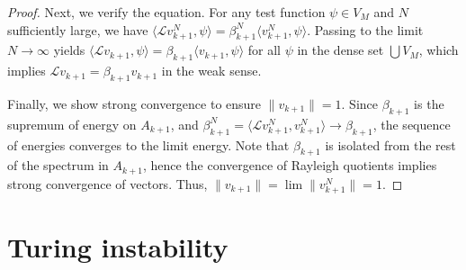 \documentclass[11pt, a4paper]{article}
\theoremstyle{break}
\theoremstyle{break}
\theoremstyle{break}
\theoremstyle{break}
\theoremstyle{break}
\theoremstyle{break}
\theoremstyle{break}
\theoremstyle{break}
\theoremstyle{break}
\theoremstyle{break}
\begin{document}
\begin{proof}
    Next, we verify the equation. For any test function $\psi \in V_M$ and $N$ sufficiently large, we have $\langle \mathcal{L} v_{k+1}^N, \psi \rangle = \beta_{k+1}^N \langle v_{k+1}^N, \psi \rangle$. Passing to the limit $N \to \infty$ yields $\langle \mathcal{L} v_{k+1}, \psi \rangle = \beta_{k+1} \langle v_{k+1}, \psi \rangle$ for all $\psi$ in the dense set $\bigcup V_M$, which implies $\mathcal{L} v_{k+1} = \beta_{k+1} v_{k+1}$ in the weak sense.
    
    Finally, we show strong convergence to ensure $\|v_{k+1}\|=1$. Since $\beta_{k+1}$ is the supremum of energy on $A_{k+1}$, and $\beta_{k+1}^N = \langle \mathcal{L} v_{k+1}^N, v_{k+1}^N \rangle \to \beta_{k+1}$, the sequence of energies converges to the limit energy. Note that $\beta_{k+1}$ is isolated from the rest of the spectrum in $A_{k+1}$, hence the convergence of Rayleigh quotients implies strong convergence of vectors. Thus, $\|v_{k+1}\| = \lim \|v_{k+1}^N\| = 1$.
\end{proof}

\section{Turing instability}
\end{document}
